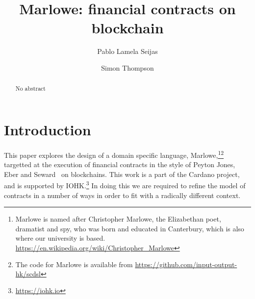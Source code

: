 \documentclass[
      acmsmall
    , screen
    , review=true
  ]{acmart}
\begin{document}
\title
  [Marlowe]
  {Marlowe: financial contracts on blockchain}

\author{Pablo Lamela Seijas}

\author{Simon Thompson}

\begin{abstract}
  No abstract
\end{abstract}



%
%


\maketitle


\section{Introduction}


\noindent
{}

This paper explores the design of a domain specific language, Marlowe,\footnote{Marlowe is named after Christopher Marlowe, the Elizabethan poet, dramatist and spy, who was born and educated in Canterbury, which is also where our university is based. \url{https://en.wikipedia.org/wiki/Christopher_Marlowe}}\footnote{The code for Marlowe is available from \url{https://github.com/input-output-hk/scdsl}
} targetted at the execution of financial contracts in the style of Peyton Jones, Eber and Seward~\cite{PeytonJones:2000} on blockchains. This work is a part of the Cardano project, and is supported by IOHK.\footnote{\url{https://iohk.io}}
In doing this we are required to refine the model of contracts in a number of ways in order to fit with a radically different context. 
\end{document}
